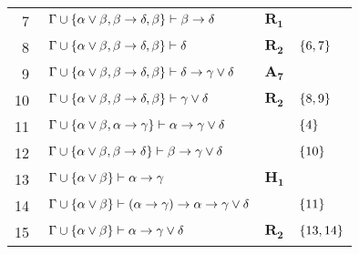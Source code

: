 \begin{tcolorbox}[enhanced jigsaw, breakable, sharp corners, colframe=black, colback=white, boxrule=0.5pt, left=1.5mm, right=1.5mm, top=1.5mm, bottom=1.5mm]
\begin{xltabular}{\textwidth}{r | X l l}
            \scriptsize{\phantom{0}7}\phantom{ } & $\ \Gamma\cup\set{\alpha\vee\beta,\beta\to\delta,\beta}\vdash\beta\to\delta$                                                            & $\hyperref[modal.rule.1]{\mathbf{R_1}}$            & \\[\rowskip]
            \scriptsize{\phantom{0}8}\phantom{ } & $\ \Gamma\cup\set{\alpha\vee\beta,\beta\to\delta,\beta}\vdash\delta$                                                                    & $\hyperref[modal.rule.2]{\mathbf{R_2}}$            & $\left\{6,7\right\}$\\[\rowskip]
            \scriptsize{\phantom{0}9}\phantom{ } & $\ \Gamma\cup\set{\alpha\vee\beta,\beta\to\delta,\beta}\vdash\delta\to\gamma\vee\delta$                                                 & $\hyperref[modal.axiom.6]{\mathbf{A_7}}$           & \\[\rowskip]
            \scriptsize{10}\phantom{ }           & $\ \Gamma\cup\set{\alpha\vee\beta,\beta\to\delta,\beta}\vdash\gamma\vee\delta$                                                          & $\hyperref[modal.rule.2]{\mathbf{R_2}}$            & $\left\{8,9\right\}$\\[\rowskip]
            \scriptsize{11}\phantom{ }           & $\ \Gamma\cup\set{\alpha\vee\beta,\alpha\to\gamma}\vdash\alpha\to\gamma\vee\delta$                                                      &                                & $\left\{4\right\}$\\[\rowskip]
            \scriptsize{12}\phantom{ }           & $\ \Gamma\cup\set{\alpha\vee\beta,\beta\to\delta}\vdash\beta\to\gamma\vee\delta$                                                        &                                & $\left\{10\right\}$\\[\rowskip]
            \scriptsize{13}\phantom{ }           & $\ \Gamma\cup\set{\alpha\vee\beta}\vdash\alpha\to\gamma$                                                                                & $\mathbf{H_1}$                                     & \\[\rowskip]
            \scriptsize{14}\phantom{ }           & $\ \Gamma\cup\set{\alpha\vee\beta}\vdash(\alpha\to\gamma)\to\alpha\to\gamma\vee\delta$                                                  &                                & $\left\{11\right\}$\\[\rowskip]
            \scriptsize{15}\phantom{ }           & $\ \Gamma\cup\set{\alpha\vee\beta}\vdash\alpha\to\gamma\vee\delta$                                                                      & $\hyperref[modal.rule.2]{\mathbf{R_2}}$            & $\left\{13,14\right\}$\\[\rowskip]

\end{xltabular}
\end{tcolorbox}

